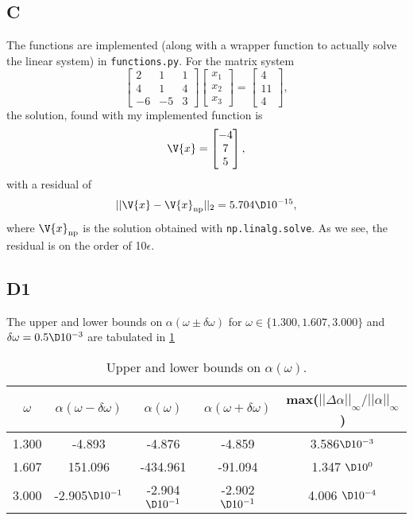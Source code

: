 \documentclass[a4paper,10pt]{article}
\begin{document}
	\subsection*{C}
	The functions are implemented (along with a wrapper function to actually solve the linear system) in \texttt{functions.py}. For the matrix system
	\begin{equation}\label{key}
		\begin{bmatrix}
		2 & 1 & 1 \\ 4 & 1 & 4 \\ -6 & -5 & 3
		\end{bmatrix} \begin{bmatrix}
		x_1 \\ x_2 \\ x_3
		\end{bmatrix} = \begin{bmatrix}
		4 \\ 11 \\ 4
		\end{bmatrix},
	\end{equation}
	the solution, found with my implemented function is
	\begin{equation}\label{key}
		\V{x} = \begin{bmatrix}
		-4 \\ 7 \\ 5
		\end{bmatrix},
	\end{equation}
	with a residual of
	\begin{equation}\label{key}
		||\V{x} - \V{x}_{\text{np}}||_2 = 5.704 \D 10^{-15},
	\end{equation}
	where $ \V{x}_{\text{np}} $ is the solution obtained with \texttt{np.linalg.solve}. As we see, the residual is on the order of 10$ \epsilon $.
	
	\subsection*{D1}
	The upper and lower bounds on $ \alpha(\omega\pm \delta \omega) $ for $ \omega \in \{1.300, 1.607, 3.000\} $ and $ \delta \omega = 0.5\D10^{-3} $ are tabulated in \ref{tab:bounds}
	\begin{table}[H]
		\centering
		\begin{tabular}{c|c|c|c|c}
			$ \omega $ & $ \alpha(\omega-\delta \omega) $ & $ \alpha(\omega) $ & $ \alpha(\omega+\delta \omega) $ & max($ ||\Delta\alpha||_{\infty}/||\alpha||_{\infty} $) \\
			\hline
			1.300 & -4.893 & -4.876 & -4.859 & 3.586$ \D10^{-3} $ \\
			1.607 & 151.096 & -434.961 & -91.094 & 1.347 $ \D10^0 $ \\
			3.000 & -2.905$ \D 10^{-1} $ & -2.904 $ \D 10^{-1} $ & -2.902 $ \D 10^{-1} $ & 4.006 $ \D 10^{-4} $
		\end{tabular}
		\caption{Upper and lower bounds on $ \alpha(\omega) $.}
		\label{tab:bounds}
	\end{table}
	
\end{document}
